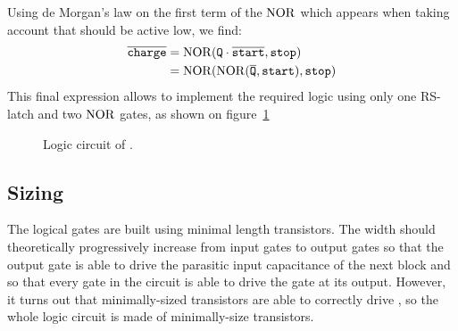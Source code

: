 Using de Morgan's law on the first term of the $\operatorname{NOR}$ which appears when taking account that  should be active low, we find:
\begin{align*}
\overline{\mathtt{charge}} &= \operatorname{NOR}(\mathtt{Q}\cdot\overline{\mathtt{start}}, \mathtt{stop})\\
&=\operatorname{NOR}(\operatorname{NOR}(\overline{\mathtt{Q}}, \mathtt{start}), \mathtt{stop})
\end{align*}
This final expression allows to implement the required logic using only one RS-latch and two $\operatorname{NOR}$ gates, as shown on figure~\ref{fig:blklogic}
\begin{figure}
  \centering
  \caption{Logic circuit of .\label{fig:blklogic}}
\end{figure}

\subsection{Sizing}
The logical gates are built using minimal length transistors. The width should theoretically progressively increase from input gates to output gates so that the output gate is able to drive the parasitic input capacitance of the next block and so that every gate in the circuit is able to drive the gate at its output. However, it turns out that minimally-sized transistors are able to correctly drive , so the whole logic circuit is made of minimally-size transistors.

